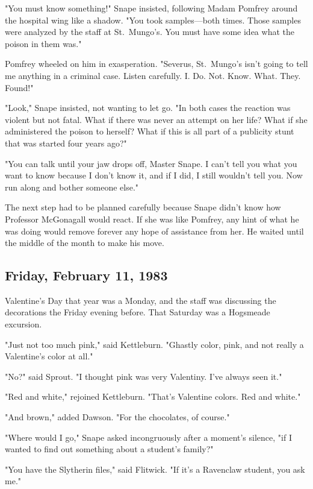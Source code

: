 "You must know something!" Snape insisted, following Madam Pomfrey around the hospital wing like a shadow. "You took samples—both times. Those samples were analyzed by the staff at St.~Mungo's. You must have some idea what the poison in them was."

Pomfrey wheeled on him in exasperation. "Severus, St.~Mungo's isn't going to tell me anything in a criminal case. Listen carefully. I. Do. Not. Know. What. They. Found!"

"Look," Snape insisted, not wanting to let go. "In both cases the reaction was violent but not fatal. What if there was never an attempt on her life? What if she administered the poison to herself? What if this is all part of a publicity stunt that was started four years ago?"

"You can talk until your jaw drops off, Master Snape. I can't tell you what you want to know because I don't know it, and if I did, I still wouldn't tell you. Now run along and bother someone else."

The next step had to be planned carefully because Snape didn't know how Professor McGonagall would react. If she was like Pomfrey, any hint of what he was doing would remove forever any hope of assistance from her. He waited until the middle of the month to make his move.

\subsection{Friday, February 11, 1983}

Valentine's Day that year was a Monday, and the staff was discussing the decorations the Friday evening before. That Saturday was a Hogsmeade excursion.

"Just not too much pink," said Kettleburn. "Ghastly color, pink, and not really a Valentine's color at all."

"No?" said Sprout. "I thought pink was very Valentiny. I've always seen it."

"Red and white," rejoined Kettleburn. "That's Valentine colors. Red and white."

"And brown," added Dawson. "For the chocolates, of course."

"Where would I go," Snape asked incongruously after a moment's silence, "if I wanted to find out something about a student's family?"

"You have the Slytherin files," said Flitwick. "If it's a Ravenclaw student, you ask me."

